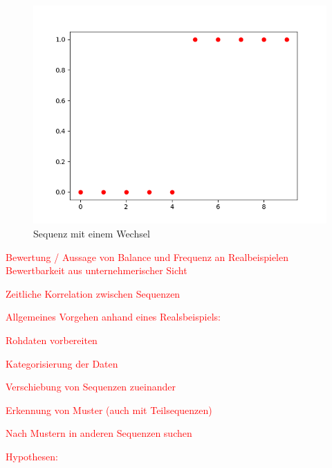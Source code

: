 \begin{figure}
	\centering
		\includegraphics[scale=0.5]{images/Klassifizierung/wechsel}
	\caption{Sequenz mit einem Wechsel}
	\label{fig:wechsel}
\end{figure}

\textcolor{red}{
	Bewertung / Aussage von Balance und Frequenz an Realbeispielen\\
	Bewertbarkeit aus unternehmerischer Sicht}

\textcolor{red}{Zeitliche Korrelation zwischen Sequenzen}

\textcolor{red}{
	Allgemeines Vorgehen anhand eines Realsbeispiels:
	\begin{list}{}{}
		\item Rohdaten vorbereiten
		\item Kategorisierung der Daten 
		\item Verschiebung von Sequenzen zueinander
		\item Erkennung von Muster (auch mit Teilsequenzen)
		\item Nach Mustern in anderen Sequenzen suchen
	\end{list}
}

\textcolor{red}{
Hypothesen:
\begin{list}{}{}
	\item  
\end{list}
}
